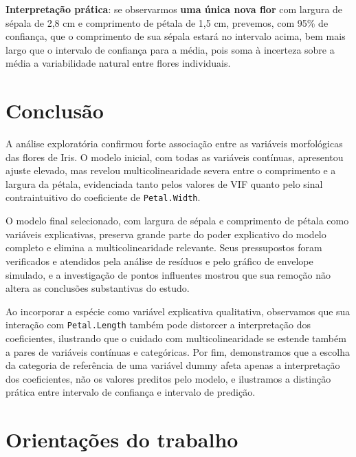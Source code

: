 \documentclass[a4paper]{_extensions/modeloufcg/modeloUFCG}
\begin{document}
\textbf{Interpretação prática}: se observarmos \textbf{uma única nova
flor} com largura de sépala de 2,8 cm e comprimento de pétala de 1,5 cm,
prevemos, com 95\% de confiança, que o comprimento de sua sépala estará
no intervalo acima, bem mais largo que o intervalo de confiança para a
média, pois soma à incerteza sobre a média a variabilidade natural entre
flores individuais.

\section{Conclusão}\label{conclusuxe3o}

A análise exploratória confirmou forte associação entre as variáveis
morfológicas das flores de Iris. O modelo inicial, com todas as
variáveis contínuas, apresentou ajuste elevado, mas revelou
multicolinearidade severa entre o comprimento e a largura da pétala,
evidenciada tanto pelos valores de VIF quanto pelo sinal contraintuitivo
do coeficiente de \texttt{Petal.Width}.

O modelo final selecionado, com largura de sépala e comprimento de
pétala como variáveis explicativas, preserva grande parte do poder
explicativo do modelo completo e elimina a multicolinearidade relevante.
Seus pressupostos foram verificados e atendidos pela análise de resíduos
e pelo gráfico de envelope simulado, e a investigação de pontos
influentes mostrou que sua remoção não altera as conclusões substantivas
do estudo.

Ao incorporar a espécie como variável explicativa qualitativa,
observamos que sua interação com \texttt{Petal.Length} também pode
distorcer a interpretação dos coeficientes, ilustrando que o cuidado com
multicolinearidade se estende também a pares de variáveis contínuas e
categóricas. Por fim, demonstramos que a escolha da categoria de
referência de uma variável dummy afeta apenas a interpretação dos
coeficientes, não os valores preditos pelo modelo, e ilustramos a
distinção prática entre intervalo de confiança e intervalo de predição.










\section{Orientações do trabalho}
\end{document}
